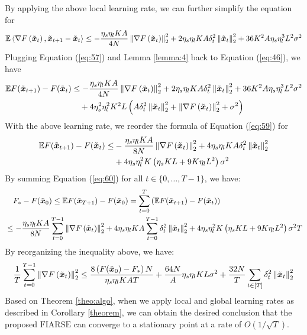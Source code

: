 \documentclass{article}
\theoremstyle{plain}
\theoremstyle{definition}
\theoremstyle{remark}
\newcommand{\algo}{\ensuremath{\text{FIARSE}}\xspace}
\newcommand{\E}{\mathbb{E}}
\renewcommand{\eqref}[1]{Equation (\ref{#1})}
\newcommand{\bracket}[1]{\left(#1\right)}
\newcommand{\norm}[1]{\left\|#1\right\|_2^2}
\newcommand{\innerproduct}[2]{\left\langle#1, #2\right\rangle}
\begin{document}
By applying the above local learning rate, we can further simplify the equation for 
\begin{align}
\E \innerproduct{\grad{t}}{\x{t+1} - \x{t}}\leq -\frac{\eta_s \eta_l K A}{4 N} \norm{\grad{t}}  + 2\eta_s \eta_l K A\delta_t^2 \norm{\x{t}} + 36 K^2 A \eta_s \eta_l^3 L^2 \sigma^2 \label{eq:57}
\end{align}
Plugging \eqref{eq:57} and Lemma \ref{lemma:4} back to \eqref{eq:46}, we have 
\begin{align}
\E F(\x{t+1}) - F(\x{t}) &\leq -\frac{\eta_s \eta_l K A}{4 N} \norm{\grad{t}}  + 2\eta_s \eta_l K A\delta_t^2 \norm{\x{t}} + 36 K^2 A \eta_s \eta_l^3 L^2 \sigma^2 \nonumber \\
&\quad+ 4 \eta_s^2 \eta_l^2 K^2 L \bracket{A \delta_t^2 \norm{\x{t}} + \norm{\grad{t}} + \sigma^2} \label{eq:59}
\end{align}
With the above learning rate, we reorder the formula of \eqref{eq:59} for
\begin{align}
\E F(\x{t+1}) - F(\x{t}) \leq &-\frac{\eta_s \eta_l K A}{8 N} \norm{\grad{t}}  + 4 \eta_s \eta_l K A\delta_t^2 \norm{\x{t}} \nonumber \\
&+ 4\eta_s \eta_l^2 K \bracket{\eta_s K L + 9 K \eta_l L^2} \sigma^2 \label{eq:60}
\end{align}
By summing \eqref{eq:60} for all $t \in \{0, \dots, T-1\}$, we have:
\begin{align}
&\quad F_* - F(\x{0}) \leq \E F(\x{T+1}) - F(\x{0}) = \sum_{t=0}^T \bracket{\E F(\x{t+1}) - F(\x{t})}\\
&\leq -\frac{\eta_s \eta_l K A}{8 N} \sum_{t=0}^{T-1} \norm{\grad{t}}  + 4 \eta_s \eta_l K A \sum_{t=0}^{T-1} \delta_t^2 \norm{\x{t}} + 4\eta_s \eta_l^2 K \bracket{\eta_s K L + 9 K \eta_l L^2} \sigma^2 T
\end{align}
By reorganizing the inequality above, we have: 
\begin{align}
    \frac{1}{T} \sum_{t=0}^{T-1} \norm{\grad{t}} \leq \frac{8 \bracket{F(\x{0}) - F_*} N}{\eta_s \eta_l K A T} + \frac{64 N}{A} \eta_s \eta_l K L \sigma^2 + \frac{32N}{T} \sum_{t \in [T]} \delta_t^2 \norm{\x{t}}
\end{align}
Based on Theorem \ref{theo:algo}, when we apply local and global learning rates as described in Corollary \ref{theorem}, we can obtain the desired conclusion that the proposed \algo can converge to a stationary point at a rate of $O(1/\sqrt{T})$. 
\end{document}
